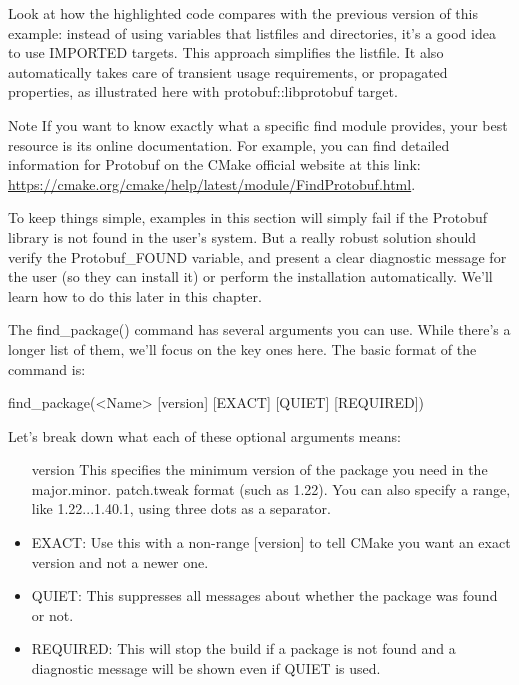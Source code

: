 Look at how the highlighted code compares with the previous version of this example: instead of using variables that listfiles and directories, it’s a good idea to use IMPORTED targets. This approach simplifies the listfile. It also automatically takes care of transient usage requirements, or propagated properties, as illustrated here with protobuf::libprotobuf target.

\begin{myNotic}{Note}
If you want to know exactly what a specific find module provides, your best resource is its online documentation. For example, you can find detailed information for Protobuf on the CMake official website at this link: \url{https://cmake.org/cmake/help/latest/module/FindProtobuf.html}.
\end{myNotic}

To keep things simple, examples in this section will simply fail if the Protobuf library is not found in the user’s system. But a really robust solution should verify the Protobuf\_FOUND variable, and present a clear diagnostic message for the user (so they can install it) or perform the installation automatically. We’ll learn how to do this later in this chapter.

The find\_package() command has several arguments you can use. While there’s a longer list of them, we’ll focus on the key ones here. The basic format of the command is:

\begin{shell}
find_package(<Name> [version] [EXACT] [QUIET] [REQUIRED])
\end{shell}

Let’s break down what each of these optional arguments means:

\begin{itemize}
\item
[version] This specifies the minimum version of the package you need in the major.minor.
patch.tweak format (such as 1.22). You can also specify a range, like 1.22...1.40.1, using three dots as a separator.

\item
EXACT: Use this with a non-range [version] to tell CMake you want an exact version and not a newer one.

\item
QUIET: This suppresses all messages about whether the package was found or not.

\item
REQUIRED: This will stop the build if a package is not found and a diagnostic message will be shown even if QUIET is used.
\end{itemize}

